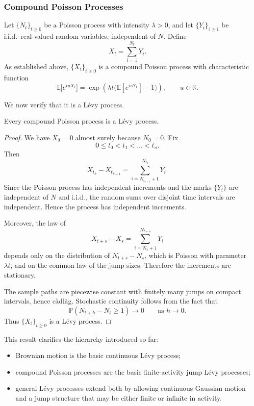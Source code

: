 \subsubsection{Compound Poisson Processes}

Let $\{N_t\}_{t\geq 0}$ be a Poisson process with intensity $\lambda>0$, and let $\{Y_i\}_{i\geq 1}$ be i.i.d.\ real-valued random variables, independent of $N$. Define
\begin{equation}\label{eq:CPP_def}
X_t = \sum_{i=1}^{N_t} Y_i.
\end{equation}
As established above, $\{X_t\}_{t\geq 0}$ is a compound Poisson process with characteristic function
\begin{equation}\label{eq:CPP_charfun}
\mathbb{E}\bigl[e^{iuX_t}\bigr] = \exp\!\left(\lambda t\bigl(\mathbb{E}[e^{iuY_1}]-1\bigr)\right), \qquad u\in\mathbb{R}.
\end{equation}

We now verify that it is a L\'evy process.

\begin{theorem}
Every compound Poisson process is a L\'evy process.
\end{theorem}

\begin{proof}
We have $X_0=0$ almost surely because $N_0=0$. Fix
\[
0\leq t_0 < t_1 < \dots < t_n.
\]
Then
\[
X_{t_k}-X_{t_{k-1}}
=
\sum_{i=N_{t_{k-1}}+1}^{N_{t_k}} Y_i.
\]
Since the Poisson process has independent increments and the marks $\{Y_i\}$ are independent of $N$ and i.i.d., the random sums over disjoint time intervals are independent. Hence the process has independent increments.

Moreover, the law of
\[
X_{t+s}-X_s
=
\sum_{i=N_s+1}^{N_{t+s}} Y_i
\]
depends only on the distribution of $N_{t+s}-N_s$, which is Poisson with parameter $\lambda t$, and on the common law of the jump sizes. Therefore the increments are stationary.

The sample paths are piecewise constant with finitely many jumps on compact intervals, hence c\`adl\`ag. Stochastic continuity follows from the fact that
\[
\mathbb{P}(N_{t+h}-N_t\geq 1)\to 0
\qquad \text{as } h\to 0.
\]
Thus $\{X_t\}_{t\geq 0}$ is a L\'evy process.
\end{proof}

This result clarifies the hierarchy introduced so far:
\begin{itemize}[label = --]
    \item Brownian motion is the basic continuous L\'evy process;
    \item compound Poisson processes are the basic finite-activity jump L\'evy processes;
    \item general L\'evy processes extend both by allowing continuous Gaussian motion and a jump structure that may be either finite or infinite in activity.
\end{itemize}
